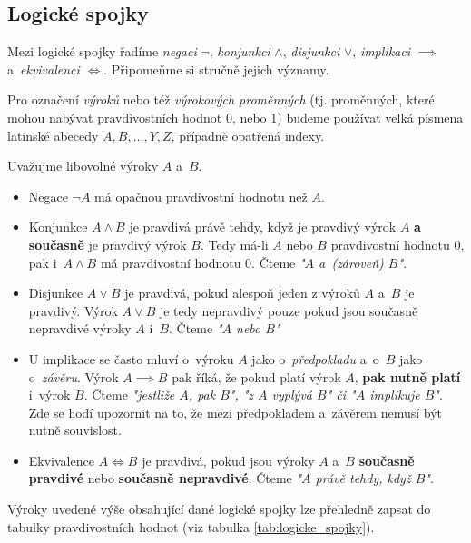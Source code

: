 \subsection{Logické spojky}\label{subsec:logicke_spojky}
Mezi logické spojky řadíme \emph{negaci} $\neg$, \emph{konjunkci} $\land$, \emph{disjunkci} $\lor$, \emph{implikaci} $\implies$ a~\emph{ekvivalenci} $\iff$. Připomeňme si stručně jejich významy.
\begin{convention}
    \label{conv:abeceda_vyrokovych_promennych}
    Pro označení \emph{výroků} nebo též \emph{výrokových proměnných} (tj. proměnných, které mohou nabývat pravdivostních hodnot 0, nebo 1) budeme používat velká písmena latinské abecedy $A,B,\dots,Y,Z$, případně opatřená indexy.
\end{convention}
Uvažujme libovolné výroky $A$ a~$B$.
\begin{itemize}
    \item Negace $\neg A$ má opačnou pravdivostní hodnotu než $A$.
    \item Konjunkce $A \land B$ je pravdivá právě tehdy, když je pravdivý výrok $A$ \textbf{a současně} je pravdivý výrok $B$. Tedy má-li $A$ nebo $B$ pravdivostní hodnotu 0, pak i~$A \land B$ má pravdivostní hodnotu 0. Čteme \emph{"$A$ a~(zároveň) $B$"}.
    \item Disjunkce $A \lor B$ je pravdivá, pokud alespoň jeden z výroků $A$ a~$B$ je pravdivý. Výrok $A \lor B$ je tedy nepravdivý pouze pokud jsou současně nepravdivé výroky $A$ i~$B$. Čteme \emph{"$A$ nebo $B$"}
    \item U implikace se často mluví o~výroku $A$ jako o~\emph{předpokladu} a~o~$B$ jako o~\emph{závěru}. Výrok $A \implies B$ pak říká, že pokud platí výrok $A$, \textbf{pak nutně platí} i~výrok $B$. Čteme \emph{"jestliže $A$, pak $B$", "z $A$ vyplývá $B$" či "$A$ implikuje $B$"}. Zde se hodí upozornit na to, že mezi předpokladem a~závěrem nemusí být nutně souvislost.
    \item Ekvivalence $A \iff B$ je pravdivá, pokud jsou výroky $A$ a~$B$ \textbf{současně pravdivé} nebo \textbf{současně nepravdivé}. Čteme \emph{"$A$ právě tehdy, když $B$"}.
\end{itemize}
Výroky uvedené výše obsahující dané logické spojky lze přehledně zapsat do tabulky pravdivostních hodnot (viz tabulka \ref{tab:logicke_spojky}).
